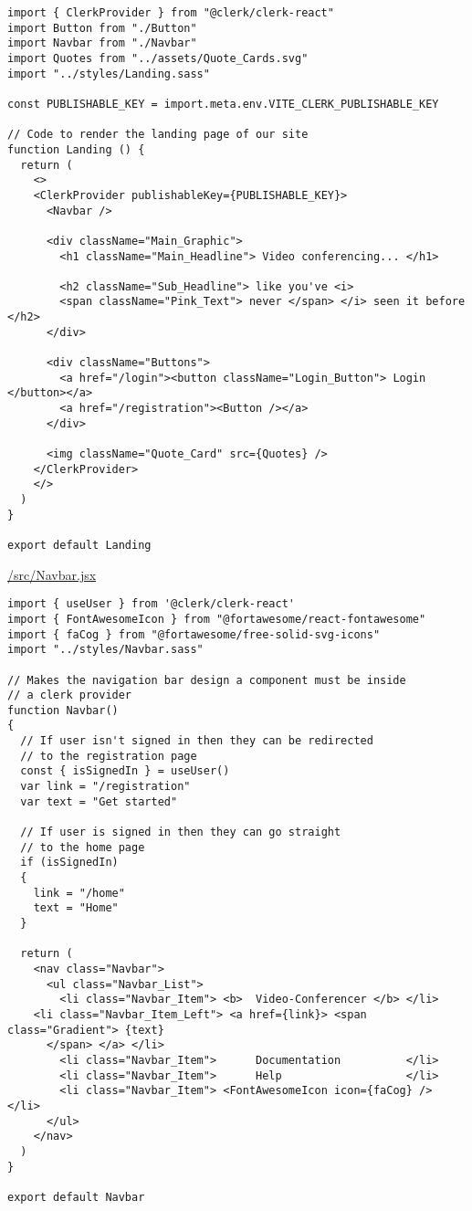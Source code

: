 \begin{verbatim}
import { ClerkProvider } from "@clerk/clerk-react"
import Button from "./Button"
import Navbar from "./Navbar"
import Quotes from "../assets/Quote_Cards.svg"
import "../styles/Landing.sass"

const PUBLISHABLE_KEY = import.meta.env.VITE_CLERK_PUBLISHABLE_KEY

// Code to render the landing page of our site
function Landing () {
  return (
    <> 
    <ClerkProvider publishableKey={PUBLISHABLE_KEY}>
      <Navbar />
    
      <div className="Main_Graphic">
        <h1 className="Main_Headline"> Video conferencing... </h1>

        <h2 className="Sub_Headline"> like you've <i>
        <span className="Pink_Text"> never </span> </i> seen it before </h2>
      </div>

      <div className="Buttons">
        <a href="/login"><button className="Login_Button"> Login </button></a>
        <a href="/registration"><Button /></a>
      </div>

      <img className="Quote_Card" src={Quotes} /> 
    </ClerkProvider>
    </>
  )
}

export default Landing
\end{verbatim}

\underline{/src/Navbar.jsx}

\begin{verbatim}
import { useUser } from '@clerk/clerk-react'
import { FontAwesomeIcon } from "@fortawesome/react-fontawesome"
import { faCog } from "@fortawesome/free-solid-svg-icons"
import "../styles/Navbar.sass"

// Makes the navigation bar design a component must be inside
// a clerk provider
function Navbar()
{
  // If user isn't signed in then they can be redirected
  // to the registration page
  const { isSignedIn } = useUser()
  var link = "/registration"
  var text = "Get started"

  // If user is signed in then they can go straight
  // to the home page
  if (isSignedIn)
  {
    link = "/home"
    text = "Home"
  }
  
  return (
    <nav class="Navbar">
      <ul class="Navbar_List">
        <li class="Navbar_Item"> <b>  Video-Conferencer </b> </li>
	<li class="Navbar_Item_Left"> <a href={link}> <span class="Gradient"> {text}
	  </span> </a> </li>
        <li class="Navbar_Item">      Documentation          </li>
        <li class="Navbar_Item">      Help                   </li>
        <li class="Navbar_Item"> <FontAwesomeIcon icon={faCog} /> </li>
      </ul>
    </nav> 
  )
}

export default Navbar
\end{verbatim}

